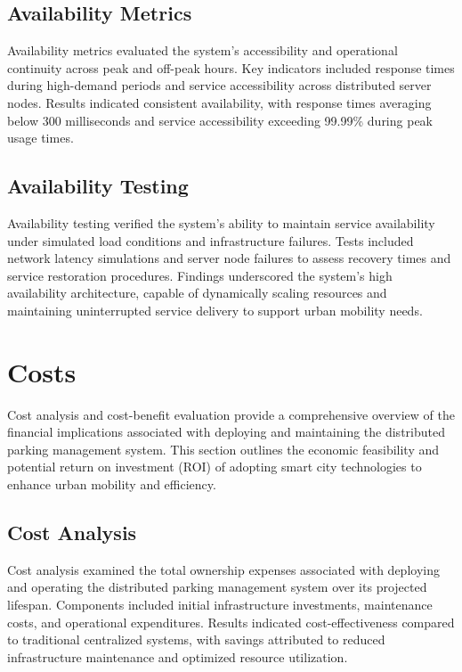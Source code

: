 \documentclass[oneside, 12pt, a4paper, draft]{book}
\begin{document}
\section{Availability Metrics}
\label{sec:orgf6074cf}

Availability metrics evaluated the system's accessibility and operational continuity across peak and off-peak hours. Key indicators included response times during high-demand periods and service accessibility across distributed server nodes. Results indicated consistent availability, with response times averaging below 300 milliseconds and service accessibility exceeding 99.99\% during peak usage times.
\section{Availability Testing}
\label{sec:org5e2cfda}

Availability testing verified the system's ability to maintain service availability under simulated load conditions and infrastructure failures. Tests included network latency simulations and server node failures to assess recovery times and service restoration procedures. Findings underscored the system's high availability architecture, capable of dynamically scaling resources and maintaining uninterrupted service delivery to support urban mobility needs.
\chapter{Costs}
\label{sec:orga329ecb}
Cost analysis and cost-benefit evaluation provide a comprehensive overview of the financial implications associated with deploying and maintaining the distributed parking management system. This section outlines the economic feasibility and potential return on investment (ROI) of adopting smart city technologies to enhance urban mobility and efficiency.
\section{Cost Analysis}
\label{sec:orge0d7fa0}

Cost analysis examined the total ownership expenses associated with deploying and operating the distributed parking management system over its projected lifespan. Components included initial infrastructure investments, maintenance costs, and operational expenditures. Results indicated cost-effectiveness compared to traditional centralized systems, with savings attributed to reduced infrastructure maintenance and optimized resource utilization.
\end{document}
